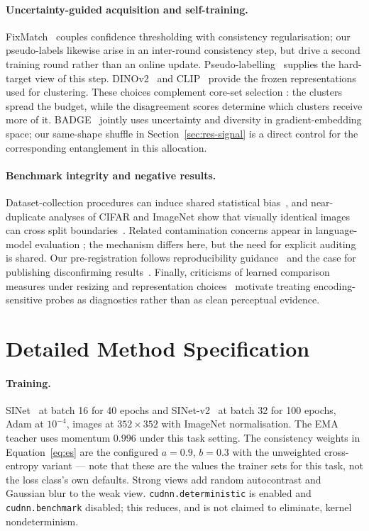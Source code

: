 \documentclass{article} %
\begin{document}
\paragraph{Uncertainty-guided acquisition and self-training.}
FixMatch~\cite{sohn2020fixmatch} couples confidence thresholding with consistency regularisation;
our pseudo-labels likewise arise in an inter-round consistency step, but drive a second training
round rather than an online update. Pseudo-labelling~\cite{lee2013pseudo} supplies the hard-target
view of this step. DINOv2~\cite{oquab2024dinov2} and CLIP~\cite{radford2021learning} provide the
frozen representations used for clustering. These choices complement core-set selection
\cite{sener2018active}: the clusters spread the budget, while the disagreement scores determine
which clusters receive more of it. BADGE~\cite{ash2020deep} jointly uses uncertainty and diversity
in gradient-embedding space; our same-shape shuffle in Section~\ref{sec:res-signal} is a direct
control for the corresponding entanglement in this allocation.

\paragraph{Benchmark integrity and negative results.}
Dataset-collection procedures can induce shared statistical bias~\cite{torralba2011unbiased}, and
near-duplicate analyses of CIFAR and ImageNet show that visually identical images can cross split
boundaries~\cite{barz2020train}. Related contamination concerns appear in language-model evaluation
\cite{wu2024antileak}; the mechanism differs here, but the need for explicit auditing is shared.
Our pre-registration follows reproducibility guidance~\cite{pineau2021improving} and the case for
publishing disconfirming results~\cite{karl2024position}. Finally, criticisms of learned comparison
measures under resizing and representation choices~\cite{parmar2022aliased,jayasumana2024rethinking}
motivate treating encoding-sensitive probes as diagnostics rather than as clean perceptual evidence.

\section{Detailed Method Specification}
\label{app:method}

\paragraph{Training.} SINet~\cite{fan2020sinet} at batch 16 for 40 epochs and SINet-v2~\cite{fan2022concealed} at batch 32 for 100 epochs, Adam at
$10^{-4}$, images at $352 \times 352$ with ImageNet normalisation. The EMA teacher uses momentum
$0.996$ under this task setting. The consistency weights in Equation~\ref{eq:es} are the configured
$a = 0.9$, $b = 0.3$ with the unweighted cross-entropy variant --- note that these are the values the
trainer sets for this task, not the loss class's own defaults. Strong views add random autocontrast
and Gaussian blur to the weak view. \texttt{cudnn.deterministic} is enabled and
\texttt{cudnn.benchmark} disabled; this reduces, and is not claimed to eliminate, kernel
nondeterminism.
\end{document}
